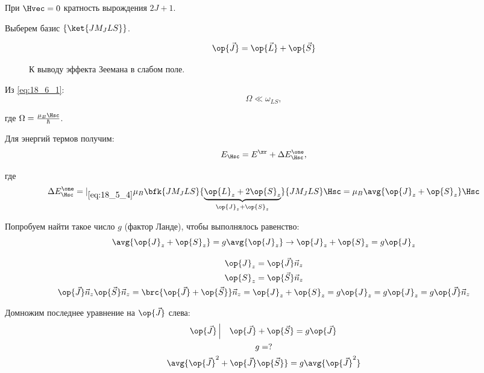 При $\Hvec = 0$ кратность вырождения $2J + 1$.

Выберем базис $\{ \ket{J M_J L S}\}$.

$$
\op{\vec{J}} = \op{\vec{L}} +\op{\vec{S}} 
$$

\begin{figure}[h!]
\centering
{}
\caption{К выводу эффекта Зеемана в слабом поле.} \label{fig:18_2}
\end{figure}


Из \eqref{eq:18_6_1}:
\begin{equation}
\label{eq:18_6_2}
\Omega \ll \omega_{LS},
\end{equation}

где $\Omega = \frac{\mu_B \Hsc}{\hbar}$.

Для энергий термов получим:
$$
E_{\Hsc} = E^\zr + \Delta E_{\Hsc}^\one,
$$

где 
$$
\Delta E_{\Hsc}^\one =|_{\eqref{eq:18_5_4}} \mu_B \bfk{J M_J L S}{\underbrace{\op{L}_z + 2\op{S}_z}_{\op{J}_z + \op{S}_z}}{J M_J L S} \Hsc  = \mu_B \avg{\op{J}_z + \op{S}_z} \Hsc
$$

Попробуем найти такое число $g$ (фактор Ланде), чтобы выполнялось равенство:
$$
\avg{\op{J}_z + \op{S}_z} = g\avg{\op{J}_z} \to \op{J}_z + \op{S}_z = g\op{J}_z 
$$

\begin{gather*}
\op{J}_z = \op{\vec{J}} \vec{n}_z \\
\op{S}_z = \op{\vec{S}} \vec{n}_z \\
\op{\vec{J}} \vec{n}_z \op{\vec{S}} \vec{n}_z = \brc{\op{\vec{J}} + \op{\vec{S}}}\vec{n}_z = \op{J}_z + \op{S}_z = g \op{J}_z
 = g \op{J}_z = g \op{\vec{J}} \vec{n}_z
\end{gather*}

Домножим последнее уравнение на $\op{\vec{J}}$ слева:
\begin{gather*}
\op{\vec{J}} \left |~~~ \op{\vec{J}} + \op{\vec{S}} = g\op{\vec{J}} \right . \\
g = ? \\
\avg{\op{\vec{J}}^2 + \op{\vec{J}} \op{\vec{S}}} = g \avg{\op{\vec{J}}^2} \\
\end{gather*}


